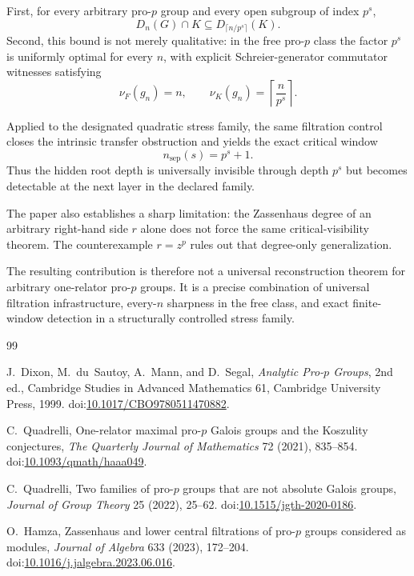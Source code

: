 \documentclass[11pt]{article}
\begin{document}
First, for every arbitrary pro-$p$ group and every open subgroup of index
$p^s$,
\[
D_n(G)\cap K\subseteq D_{\lceil n/p^s\rceil}(K).
\]
Second, this bound is not merely qualitative: in the free pro-$p$ class
the factor $p^s$ is uniformly optimal for every $n$, with explicit
Schreier-generator commutator witnesses satisfying
\[
\nu_F(g_n)=n,
\qquad
\nu_K(g_n)=\left\lceil\frac n{p^s}\right\rceil.
\]

Applied to the designated quadratic stress family, the same filtration
control closes the intrinsic transfer obstruction and yields the exact
critical window
\[
\boxed{n_{\mathrm{sep}}(s)=p^s+1.}
\]
Thus the hidden root depth is universally invisible through depth $p^s$
but becomes detectable at the next layer in the declared family.

The paper also establishes a sharp limitation: the Zassenhaus degree of
an arbitrary right-hand side $r$ alone does not force the same
critical-visibility theorem.  The counterexample $r=z^p$ rules out that
degree-only generalization.

The resulting contribution is therefore not a universal reconstruction
theorem for arbitrary one-relator pro-$p$ groups.  It is a precise
combination of universal filtration infrastructure, every-$n$ sharpness
in the free class, and exact finite-window detection in a structurally
controlled stress family.

\begin{thebibliography}{99}

J.~Dixon, M.~du~Sautoy, A.~Mann, and D.~Segal,
\emph{Analytic Pro-$p$ Groups}, 2nd ed.,
Cambridge Studies in Advanced Mathematics 61,
Cambridge University Press, 1999. doi:\href{https://doi.org/10.1017/CBO9780511470882}{10.1017/CBO9780511470882}.

C.~Quadrelli,
One-relator maximal pro-$p$ Galois groups and the Koszulity conjectures,
\emph{The Quarterly Journal of Mathematics} 72 (2021), 835--854. doi:\href{https://doi.org/10.1093/qmath/haaa049}{10.1093/qmath/haaa049}.

C.~Quadrelli,
Two families of pro-$p$ groups that are not absolute Galois groups,
\emph{Journal of Group Theory} 25 (2022), 25--62. doi:\href{https://doi.org/10.1515/jgth-2020-0186}{10.1515/jgth-2020-0186}.

O.~Hamza,
Zassenhaus and lower central filtrations of pro-$p$ groups considered as modules,
\emph{Journal of Algebra} 633 (2023), 172--204. doi:\href{https://doi.org/10.1016/j.jalgebra.2023.06.016}{10.1016/j.jalgebra.2023.06.016}.

\end{thebibliography}
\end{document}
